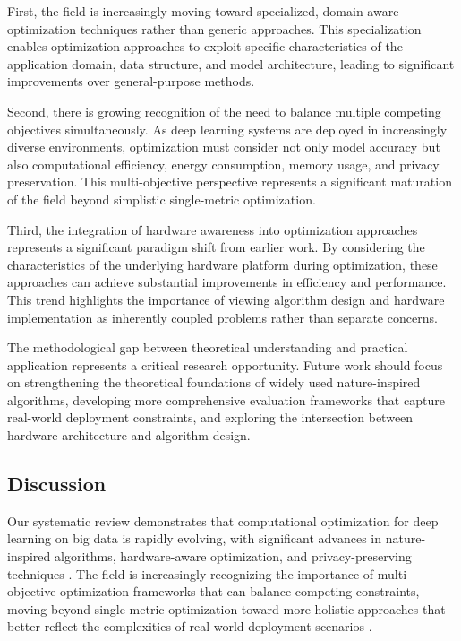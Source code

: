 \documentclass[acmsmall]{acmart}
\begin{document}
First, the field is increasingly moving toward specialized, domain-aware optimization techniques rather than generic approaches. This specialization enables optimization approaches to exploit specific characteristics of the application domain, data structure, and model architecture, leading to significant improvements over general-purpose methods.

Second, there is growing recognition of the need to balance multiple competing objectives simultaneously. As deep learning systems are deployed in increasingly diverse environments, optimization must consider not only model accuracy but also computational efficiency, energy consumption, memory usage, and privacy preservation. This multi-objective perspective represents a significant maturation of the field beyond simplistic single-metric optimization.

Third, the integration of hardware awareness into optimization approaches represents a significant paradigm shift from earlier work. By considering the characteristics of the underlying hardware platform during optimization, these approaches can achieve substantial improvements in efficiency and performance. This trend highlights the importance of viewing algorithm design and hardware implementation as inherently coupled problems rather than separate concerns.

The methodological gap between theoretical understanding and practical application represents a critical research opportunity. Future work should focus on strengthening the theoretical foundations of widely used nature-inspired algorithms, developing more comprehensive evaluation frameworks that capture real-world deployment constraints, and exploring the intersection between hardware architecture and algorithm design.

\subsection{Discussion}\label{subsec:discussion}
Our systematic review demonstrates that computational optimization for deep learning on big data is rapidly evolving, with significant advances in nature-inspired algorithms, hardware-aware optimization, and privacy-preserving techniques \citep{Eid20223845, Kim2022, Zhang20229876}. The field is increasingly recognizing the importance of multi-objective optimization frameworks that can balance competing constraints, moving beyond single-metric optimization toward more holistic approaches that better reflect the complexities of real-world deployment scenarios \citep{Deb2014}.
\end{document}
